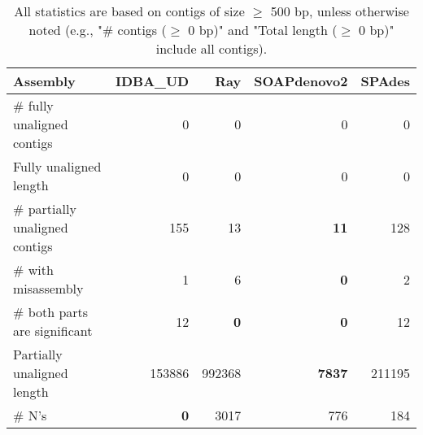 \documentclass[12pt,a4paper]{article}
\begin{document}
\begin{table}[ht]
\begin{center}
\caption{All statistics are based on contigs of size $\geq$ 500 bp, unless otherwise noted (e.g., "\# contigs ($\geq$ 0 bp)" and "Total length ($\geq$ 0 bp)" include all contigs).}
\begin{tabular}{|l*{4}{|r}|}
\hline
Assembly & IDBA\_UD & Ray & SOAPdenovo2 & SPAdes \\ \hline
\# fully unaligned contigs & 0 & 0 & 0 & 0 \\ \hline
Fully unaligned length & 0 & 0 & 0 & 0 \\ \hline
\# partially unaligned contigs & 155 & 13 & {\bf 11} & 128 \\ \hline
\hspace{5mm}\# with misassembly & 1 & 6 & {\bf 0} & 2 \\ \hline
\hspace{5mm}\# both parts are significant & 12 & {\bf 0} & {\bf 0} & 12 \\ \hline
Partially unaligned length & 153886 & 992368 & {\bf 7837} & 211195 \\ \hline
\# N's & {\bf 0} & 3017 & 776 & 184 \\ \hline
\end{tabular}
\end{center}
\end{table}
\end{document}
